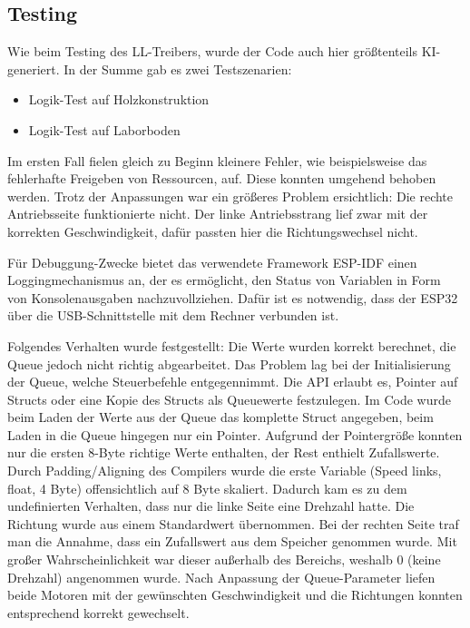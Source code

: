 \subsection{Testing} \label{sec:diff_drive_tests}

Wie beim Testing des LL-Treibers, wurde der Code auch hier größtenteils KI-generiert. In der Summe gab es zwei Testszenarien:

\begin{itemize}
    \item Logik-Test auf Holzkonstruktion
    \item Logik-Test auf Laborboden
\end{itemize}

Im ersten Fall fielen gleich zu Beginn kleinere Fehler, wie beispielsweise das fehlerhafte Freigeben von Ressourcen, auf. Diese konnten umgehend behoben werden. Trotz der Anpassungen war ein größeres Problem ersichtlich: Die rechte Antriebsseite funktionierte nicht. Der linke Antriebsstrang lief zwar mit der korrekten Geschwindigkeit, dafür passten hier die Richtungswechsel nicht. \newline

Für Debuggung-Zwecke bietet das verwendete Framework ESP-IDF einen Loggingmechanismus an, der es ermöglicht, den Status von Variablen in Form von Konsolenausgaben nachzuvollziehen. Dafür ist es notwendig, dass der ESP32 über die USB-Schnittstelle mit dem Rechner verbunden ist. \newline

Folgendes Verhalten wurde festgestellt: Die Werte wurden korrekt berechnet, die Queue jedoch nicht richtig abgearbeitet. Das Problem lag bei der Initialisierung der Queue, welche Steuerbefehle entgegennimmt. Die API erlaubt es, Pointer auf Structs oder eine Kopie des Structs als Queuewerte festzulegen. Im Code wurde beim Laden der Werte aus der Queue das komplette Struct angegeben, beim Laden in die Queue hingegen nur ein Pointer. Aufgrund der Pointergröße konnten nur die ersten 8-Byte richtige Werte enthalten, der Rest enthielt Zufallswerte. Durch Padding/Aligning des Compilers wurde die erste Variable (Speed links, float, 4 Byte) offensichtlich auf 8 Byte skaliert. Dadurch kam es zu dem undefinierten Verhalten, dass nur die linke Seite eine Drehzahl hatte. Die Richtung wurde aus einem Standardwert übernommen. Bei der rechten Seite traf man die Annahme, dass ein Zufallswert aus dem Speicher genommen wurde. Mit großer Wahrscheinlichkeit war dieser außerhalb des Bereichs, weshalb 0 (keine Drehzahl) angenommen wurde. Nach Anpassung der Queue-Parameter liefen beide Motoren mit der gewünschten Geschwindigkeit und die Richtungen konnten entsprechend korrekt gewechselt. \newline

